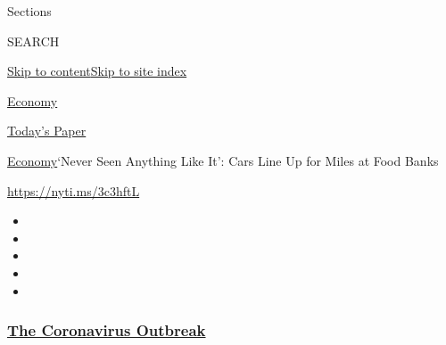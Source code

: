 Sections

SEARCH

\protect\hyperlink{site-content}{Skip to
content}\protect\hyperlink{site-index}{Skip to site index}

\href{https://www.nytimes3xbfgragh.onion/section/business/economy}{Economy}

\href{https://myaccount.nytimes3xbfgragh.onion/auth/login?response_type=cookie\&client_id=vi}{}

\href{https://www.nytimes3xbfgragh.onion/section/todayspaper}{Today's
Paper}

\href{/section/business/economy}{Economy}\textbar{}`Never Seen Anything
Like It': Cars Line Up for Miles at Food Banks

\url{https://nyti.ms/3c3hftL}

\begin{itemize}
\item
\item
\item
\item
\item
\end{itemize}

\hypertarget{the-coronavirus-outbreak}{%
\subsubsection{\texorpdfstring{\href{https://www.nytimes3xbfgragh.onion/news-event/coronavirus?name=styln-coronavirus-markets\&region=TOP_BANNER\&block=storyline_menu_recirc\&action=click\&pgtype=Article\&impression_id=1215bf50-f52d-11ea-953b-e7f6208efedb\&variant=undefined}{The
Coronavirus
Outbreak}}{The Coronavirus Outbreak}}\label{the-coronavirus-outbreak}}

